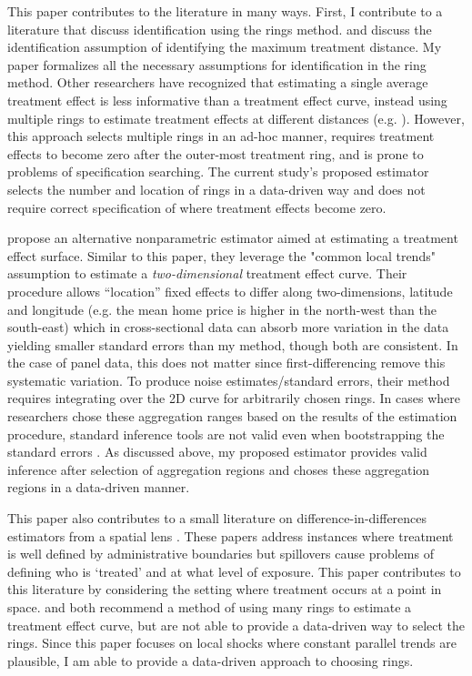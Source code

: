 \documentclass[12pt]{article}
\begin{document}
This paper contributes to the literature in many ways. First, I contribute to a literature that discuss identification using the rings method. \citet{Sullivan_2017} and \citet{Gerardi_Rosenblatt_Willen_Yao_2015} discuss the identification assumption of identifying the maximum treatment distance. My paper formalizes all the necessary assumptions for identification in the ring method. Other researchers have recognized that estimating a single average treatment effect is less informative than a treatment effect curve, instead using multiple rings to estimate treatment effects at different distances (e.g. \citet{Alexander_Currie_Schnell_2019,Casey_Schiman_Wachala_2018,Di_Tella_Schargrodsky_2004}). However, this approach selects multiple rings in an ad-hoc manner, requires treatment effects to become zero after the outer-most treatment ring, and is prone to problems of specification searching. The current study's proposed estimator selects the number and location of rings in a data-driven way and does not require correct specification of where treatment effects become zero.

\citet{Diamond_McQuade_2019} propose an alternative nonparametric estimator aimed at estimating a treatment effect surface. Similar to this paper, they leverage the "common local trends" assumption to estimate a \emph{two-dimensional} treatment effect curve. Their procedure allows ``location'' fixed effects to differ along two-dimensions, latitude and longitude (e.g. the mean home price is higher in the north-west than the south-east) which in cross-sectional data can absorb more variation in the data yielding smaller standard errors than my method, though both are consistent. In the case of panel data, this does not matter since first-differencing remove this systematic variation. To produce noise estimates/standard errors, their method requires integrating over the 2D curve for arbitrarily chosen rings. In cases where researchers chose these aggregation ranges based on the results of the estimation procedure, standard inference tools are not valid even when bootstrapping the standard errors \citep{Leeb_Potscher_2005}. As discussed above, my proposed estimator provides valid inference after selection of aggregation regions and choses these aggregation regions in a data-driven manner.

This paper also contributes to a small literature on difference-in-differences estimators from a spatial lens \citep{Butts_2021,Clarke_2017,Berg_Streitz_2019,Verbitsky-Savitz_Raudenbush_2012,Delgado_Florax_2015}. These papers address instances where treatment is well defined by administrative boundaries but spillovers cause problems of defining who is `treated' and at what level of exposure. This paper contributes to this literature by considering the setting where treatment occurs at a point in space. \citet{Butts_2021} and \citet{Clarke_2017} both recommend a method of using many rings to estimate a treatment effect curve, but are not able to provide a data-driven way to select the rings. Since this paper focuses on local shocks where constant parallel trends are plausible, I am able to provide a data-driven approach to choosing rings. 
\end{document}
